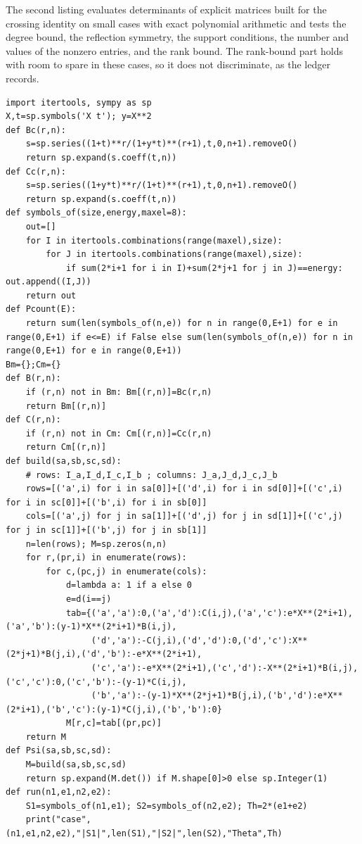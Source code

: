\documentclass[11pt,letterpaper]{report}
\theoremstyle{plain}
\theoremstyle{definition}
\theoremstyle{remark}
\begin{document}
The second listing evaluates determinants of explicit matrices built for the crossing identity on small cases with exact polynomial arithmetic and tests the degree bound, the reflection symmetry, the support conditions, the number and values of the nonzero entries, and the rank bound. The rank-bound part holds with room to spare in these cases, so it does not discriminate, as the ledger records.

\begin{Verbatim}[fontsize=\scriptsize,breaklines=true,breakanywhere=true,frame=single]
import itertools, sympy as sp
X,t=sp.symbols('X t'); y=X**2
def Bc(r,n):
    s=sp.series((1+t)**r/(1+y*t)**(r+1),t,0,n+1).removeO()
    return sp.expand(s.coeff(t,n))
def Cc(r,n):
    s=sp.series((1+y*t)**r/(1+t)**(r+1),t,0,n+1).removeO()
    return sp.expand(s.coeff(t,n))
def symbols_of(size,energy,maxel=8):
    out=[]
    for I in itertools.combinations(range(maxel),size):
        for J in itertools.combinations(range(maxel),size):
            if sum(2*i+1 for i in I)+sum(2*j+1 for j in J)==energy: out.append((I,J))
    return out
def Pcount(E):
    return sum(len(symbols_of(n,e)) for n in range(0,E+1) for e in range(0,E+1) if e<=E) if False else sum(len(symbols_of(n,e)) for n in range(0,E+1) for e in range(0,E+1))
Bm={};Cm={}
def B(r,n):
    if (r,n) not in Bm: Bm[(r,n)]=Bc(r,n)
    return Bm[(r,n)]
def C(r,n):
    if (r,n) not in Cm: Cm[(r,n)]=Cc(r,n)
    return Cm[(r,n)]
def build(sa,sb,sc,sd):
    # rows: I_a,I_d,I_c,I_b ; columns: J_a,J_d,J_c,J_b
    rows=[('a',i) for i in sa[0]]+[('d',i) for i in sd[0]]+[('c',i) for i in sc[0]]+[('b',i) for i in sb[0]]
    cols=[('a',j) for j in sa[1]]+[('d',j) for j in sd[1]]+[('c',j) for j in sc[1]]+[('b',j) for j in sb[1]]
    n=len(rows); M=sp.zeros(n,n)
    for r,(pr,i) in enumerate(rows):
        for c,(pc,j) in enumerate(cols):
            d=lambda a: 1 if a else 0
            e=d(i==j)
            tab={('a','a'):0,('a','d'):C(i,j),('a','c'):e*X**(2*i+1),('a','b'):(y-1)*X**(2*i+1)*B(i,j),
                 ('d','a'):-C(j,i),('d','d'):0,('d','c'):X**(2*j+1)*B(j,i),('d','b'):-e*X**(2*i+1),
                 ('c','a'):-e*X**(2*i+1),('c','d'):-X**(2*i+1)*B(i,j),('c','c'):0,('c','b'):-(y-1)*C(i,j),
                 ('b','a'):-(y-1)*X**(2*j+1)*B(j,i),('b','d'):e*X**(2*i+1),('b','c'):(y-1)*C(j,i),('b','b'):0}
            M[r,c]=tab[(pr,pc)]
    return M
def Psi(sa,sb,sc,sd):
    M=build(sa,sb,sc,sd)
    return sp.expand(M.det()) if M.shape[0]>0 else sp.Integer(1)
def run(n1,e1,n2,e2):
    S1=symbols_of(n1,e1); S2=symbols_of(n2,e2); Th=2*(e1+e2)
    print("case",(n1,e1,n2,e2),"|S1|",len(S1),"|S2|",len(S2),"Theta",Th)

\end{Verbatim}
\end{document}
